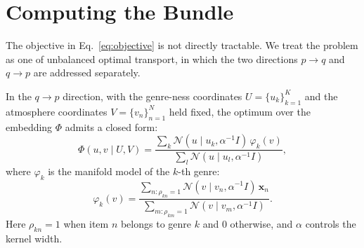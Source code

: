 %
%
%
%



\section{Computing the Bundle}\label{app:algorithm}

The objective in Eq.~\eqref{eq:objective} is not directly tractable.
We treat the problem as one of unbalanced optimal transport, in which
the two directions $p \to q$ and $q \to p$ are addressed separately.

In the $q \to p$ direction, with the genre-ness coordinates
$U = \{u_k\}_{k=1}^K$ and the atmosphere coordinates
$V = \{v_n\}_{n=1}^N$ held fixed, the optimum over the embedding
$\Phi$ admits a closed form:
\begin{equation}\label{eq:phi-closed}
    \Phi(u, v \mid U, V) =
    \frac{\sum_k \mathcal{N}(u \mid u_k, \alpha^{-1} I)\, \varphi_k(v)}
    {\sum_l \mathcal{N}(u \mid u_l, \alpha^{-1} I)},
\end{equation}
where $\varphi_k$ is the manifold model of the $k$-th genre:
\begin{equation}\label{eq:varphi}
    \varphi_k(v) =
    \frac{\sum_{n:\rho_{kn}=1} \mathcal{N}(v \mid v_n, \alpha^{-1} I)\, \mathbf{x}_n}
    {\sum_{m:\rho_{km}=1} \mathcal{N}(v \mid v_m, \alpha^{-1} I)}.
\end{equation}
Here $\rho_{kn} = 1$ when item $n$ belongs to genre $k$ and $0$
otherwise, and $\alpha$ controls the kernel width.

